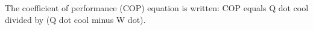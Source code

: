 The coefficient of performance (COP) equation is written:  
COP equals Q dot cool divided by (Q dot cool minus W dot).